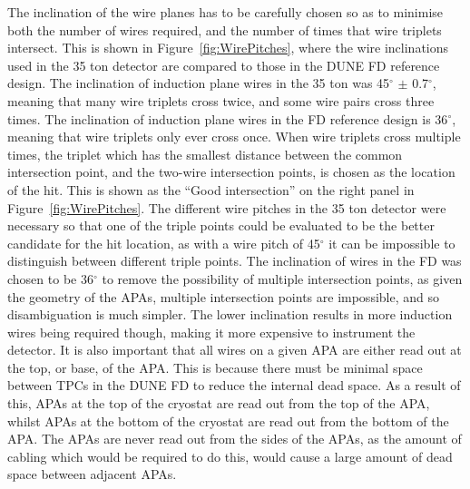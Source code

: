 The inclination of the wire planes has to be carefully chosen so as to minimise both the number of wires required, and the number of times that wire triplets intersect. This is shown in Figure~\ref{fig:WirePitches}, where the wire inclinations used in the 35 ton detector are compared to those in the DUNE FD reference design. The inclination of induction plane wires in the 35 ton was 45$^{\circ}$ $\pm$ 0.7$^{\circ}$, meaning that many wire triplets cross twice, and some wire pairs cross three times. The inclination of induction plane wires in the FD reference design is 36$^{\circ}$, meaning that wire triplets only ever cross once. When wire triplets cross multiple times, the triplet which has the smallest distance between the common intersection point, and the two-wire intersection points, is chosen as the location of the hit. This is shown as the ``Good intersection'' on the right panel in Figure~\ref{fig:WirePitches}. The different wire pitches in the 35 ton detector were necessary so that one of the triple points could be evaluated to be the better candidate for the hit location, as with a wire pitch of 45$^{\circ}$ it can be impossible to distinguish between different triple points. The inclination of wires in the FD was chosen to be 36$^{\circ}$ to remove the possibility of multiple intersection points, as given the geometry of the APAs, multiple intersection points are impossible, and so disambiguation is much simpler. The lower inclination results in more induction wires being required though, making it more expensive to instrument the detector. It is also important that all wires on a given APA are either read out at the top, or base, of the APA. This is because there must be minimal space between TPCs in the DUNE FD to reduce the internal dead space. As a result of this, APAs at the top of the cryostat are read out from the top of the APA, whilst APAs at the bottom of the cryostat are read out from the bottom of the APA. The APAs are never read out from the sides of the APAs, as the amount of cabling which would be required to do this, would cause a large amount of dead space between adjacent APAs. \\

